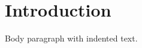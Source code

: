 \documentclass{article}
\begin{document}
\section{Introduction}
  Body paragraph with indented text.
\end{document}
